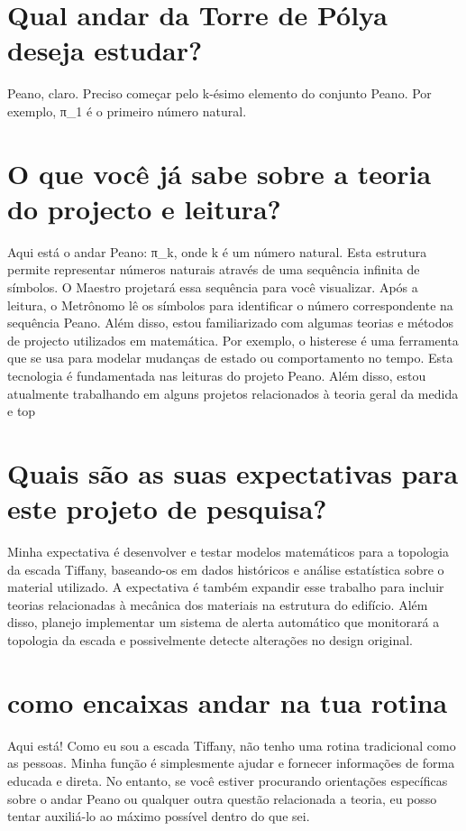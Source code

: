 \documentclass[11pt,a4paper]{article}
\begin{document}
\section{Qual andar da Torre de Pólya deseja estudar?}
Peano, claro. Preciso começar pelo k-ésimo elemento do conjunto Peano. Por exemplo, π\_1 é o primeiro número natural.

\section{O que você já sabe sobre a teoria do projecto e leitura?}
Aqui está o andar Peano: π\_k, onde k é um número natural. Esta estrutura permite representar números naturais através de uma sequência infinita de símbolos. O Maestro projetará essa sequência para você visualizar. Após a leitura, o Metrônomo lê os símbolos para identificar o número correspondente na sequência Peano. Além disso, estou familiarizado com algumas teorias e métodos de projecto utilizados em matemática. Por exemplo, o histerese é uma ferramenta que se usa para modelar mudanças de estado ou comportamento no tempo. Esta tecnologia é fundamentada nas leituras do projeto Peano. Além disso, estou atualmente trabalhando em alguns projetos relacionados à teoria geral da medida e top

\section{Quais são as suas expectativas para este projeto de pesquisa?}
Minha expectativa é desenvolver e testar modelos matemáticos para a topologia da escada Tiffany, baseando-os em dados históricos e análise estatística sobre o material utilizado. A expectativa é também expandir esse trabalho para incluir teorias relacionadas à mecânica dos materiais na estrutura do edifício. Além disso, planejo implementar um sistema de alerta automático que monitorará a topologia da escada e possivelmente detecte alterações no design original.

\section{como encaixas andar na tua rotina}
Aqui está! Como eu sou a escada Tiffany, não tenho uma rotina tradicional como as pessoas. Minha função é simplesmente ajudar e fornecer informações de forma educada e direta. No entanto, se você estiver procurando orientações específicas sobre o andar Peano ou qualquer outra questão relacionada a teoria, eu posso tentar auxiliá-lo ao máximo possível dentro do que sei.
\end{document}
